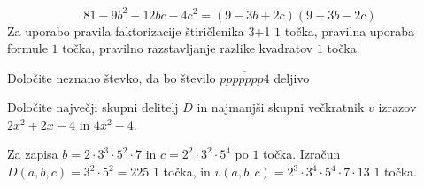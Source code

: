 \documentclass[addpoints]{exam}
\begin{document}
\begin{questions}
\begin{parts}
        \begin{solution}[3cm]
            $$81-9b^2+12bc-4c^2=(9-3b+2c)(9+3b-2c)$$
            Za uporabo pravila faktorizacije štiričlenika 3+1 $1$ točka, pravilna uporaba formule $1$ točka, pravilno razstavljanje razlike kvadratov $1$ točka.
        \end{solution}


    \end{parts}



    \question
    Določite neznano števko, da bo število $\overline{ppppppp4}$ deljivo




    \question[4]
    Določite največji skupni delitelj $D$ in najmanjši skupni večkratnik $v$ izrazov $2x^2+2x-4$ in $4x^2-4$.

    \begin{solution}[6cm]
        Za zapisa $b=2\cdot 3^3\cdot 5^2\cdot 7$ in $c=2^2\cdot 3^2\cdot 5^4$ po $1$ točka. 
        Izračun $D(a,b,c)=3^2\cdot 5^2=225$ $1$ točka, in $v(a,b,c)=2^3\cdot 3^4\cdot 5^4\cdot 7\cdot 13$ $1$ točka.
    \end{solution}
    

\end{questions}
\end{document}

